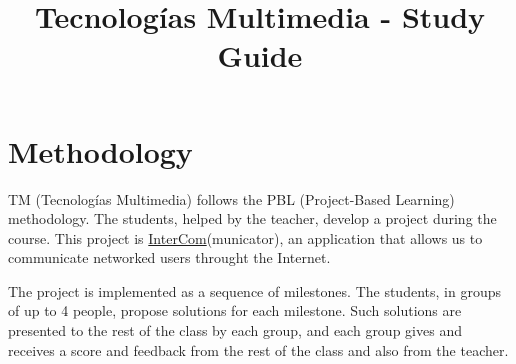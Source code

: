 \title{Tecnologías Multimedia - Study Guide}

\maketitle

\section{Methodology}
TM (Tecnologías Multimedia) follows the PBL (Project-Based Learning) methodology. The students,
helped by the teacher, develop a project during the course. This
project
is \href{https://github.com/Tecnologias-multimedia/intercom}{InterCom}(municator),
an application that allows us to communicate networked users throught
the Internet.

The project is implemented as a sequence of milestones. The students,
in groups of up to 4 people, propose solutions for each
milestone. Such solutions are presented to the rest of the class by
each group, and each group gives and receives a score and feedback
from the rest of the class and also from the teacher.

